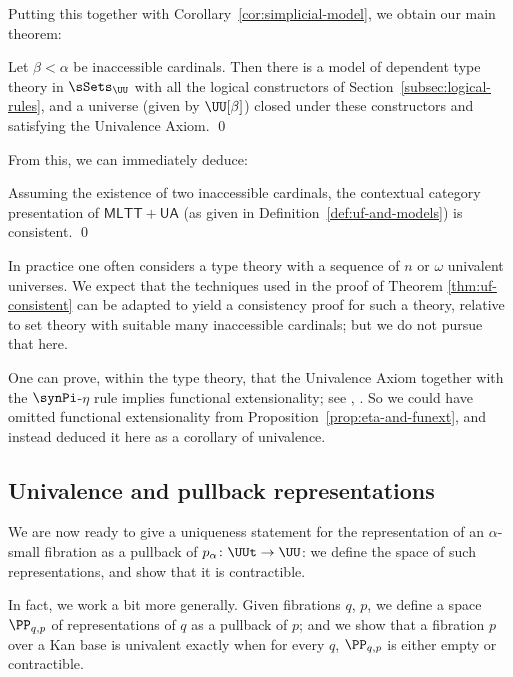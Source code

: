 Putting this together with Corollary~\ref{cor:simplicial-model}, we obtain our main theorem:
 
\begin{theorem} \label{thm:simplicial-model-univalent}
Let $\beta < \alpha$ be inaccessible cardinals.  Then there is a model of dependent type theory in $\sSets_{\UU}$ with all the logical constructors of Section~\ref{subsec:logical-rules}, and a universe (given by $\UU[\beta]$) closed under these constructors and satisfying the Univalence Axiom. \qed
\end{theorem}

From this, we can immediately deduce:

\begin{theorem} \label{thm:uf-consistent}
  Assuming the existence of two inaccessible cardinals, the contextual category presentation of $\mathsf{MLTT}+\mathsf{UA}$ (as given in Definition~\ref{def:uf-and-models}) is consistent. \qed
\end{theorem}

In practice one often considers a type theory with a sequence of $n$ or $\omega$ univalent universes. We expect that the techniques used in the proof of Theorem \ref{thm:uf-consistent} can be adapted to yield a consistency proof for such a theory, relative to set theory with suitable many inaccessible cardinals; but we do not pursue that here.

\begin{remark}
One can prove, within the type theory, that the Univalence Axiom together with the $\synPi$-$\eta$ rule implies functional extensionality; see \cite{voevodsky:univalent-foundations-coq}, \cite[Sec.~4.9]{hott:book}.  So we could have omitted functional extensionality from Proposition~\ref{prop:eta-and-funext}, and instead deduced it here as a corollary of univalence.
\end{remark} 

\subsection{Univalence and pullback representations} \label{subsec:pullback-reps}

We are now ready to give a uniqueness statement for the representation of an $\alpha$-small fibration as a pullback of ${p_\alpha} \colon \UUt \to \UU$: we define the space of such representations, and show that it is contractible. 

In fact, we work a bit more generally.  Given fibrations $q$, $p$, we define a space $\PP_{q,p}$ of representations of $q$ as a pullback of $p$; and we show that a fibration $p$ over a Kan base is univalent exactly when for every $q$, $\PP_{q,p}$ is either empty or contractible.

